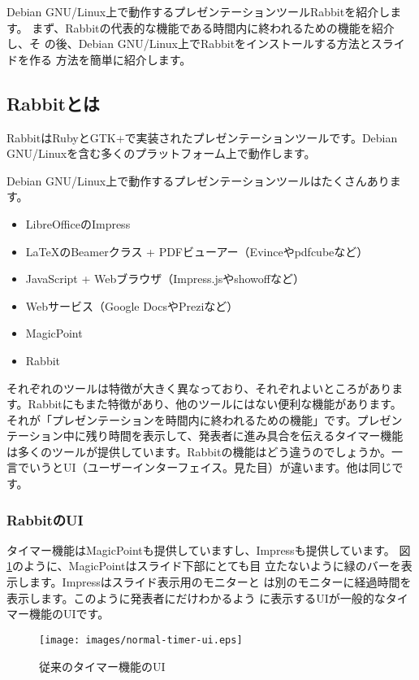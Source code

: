 \documentclass[mingoth,a4paper]{jsarticle}
\begin{document}
\label{sec:kou}

Debian GNU/Linux上で動作するプレゼンテーションツールRabbitを紹介します。
まず、Rabbitの代表的な機能である時間内に終われるための機能を紹介し、そ
の後、Debian GNU/Linux上でRabbitをインストールする方法とスライドを作る
方法を簡単に紹介します。

\subsection{Rabbitとは}

RabbitはRubyとGTK+で実装されたプレゼンテーションツールです。Debian
GNU/Linuxを含む多くのプラットフォーム上で動作します。

Debian GNU/Linux上で動作するプレゼンテーションツールはたくさんあります。

\begin{itemize}
 \item LibreOfficeのImpress
 \item LaTeXのBeamerクラス + PDFビューアー（Evinceやpdfcubeなど）
 \item JavaScript + Webブラウザ（Impress.jsやshowoffなど）
 \item Webサービス（Google DocsやPreziなど）
 \item MagicPoint
 \item Rabbit
\end{itemize}

それぞれのツールは特徴が大きく異なっており、それぞれよいところがありま
す。Rabbitにもまた特徴があり、他のツールにはない便利な機能があります。
それが「プレゼンテーションを時間内に終われるための機能」です。プレゼン
テーション中に残り時間を表示して、発表者に進み具合を伝えるタイマー機能
は多くのツールが提供しています。Rabbitの機能はどう違うのでしょうか。一
言でいうとUI（ユーザーインターフェイス。見た目）が違います。他は同じで
す。

\subsubsection{RabbitのUI}

タイマー機能はMagicPointも提供していますし、Impressも提供しています。
図\ref{fig:normal-timer-ui}のように、MagicPointはスライド下部にとても目
立たないように緑のバーを表示します。Impressはスライド表示用のモニターと
は別のモニターに経過時間を表示します。このように発表者にだけわかるよう
に表示するUIが一般的なタイマー機能のUIです。

\begin{figure}[ht]
  \begin{center}
    \texttt{[image: images/normal-timer-ui.eps]}
  \end{center}
  \caption{従来のタイマー機能のUI}
  \label{fig:normal-timer-ui}
\end{figure}
\end{document}
